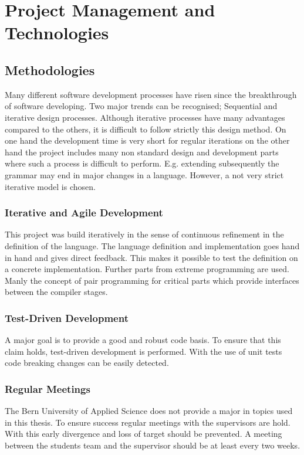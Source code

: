 \part{Project Management and Technologies}
\chapter{Methodologies}
Many different software development processes have risen since the
breakthrough of software developing. Two major trends can be recognised;
Sequential and iterative design processes. Although iterative processes
have many advantages compared to the others, it is difficult to follow
strictly this design method. On one hand the development time is very
short for regular iterations on the other hand the project includes
many non standard design and development parts where such a process is
difficult to perform. E.g. extending subsequently the grammar may end
in major changes in a language. However, a not very strict iterative
model is chosen.

\section{Iterative and Agile Development}
This project was build iteratively in the sense of continuous
refinement in the definition of the language. The language definition and
implementation goes hand in hand and gives direct feedback. This makes it
possible to test the definition on a concrete implementation. Further
parts from extreme programming are used. Manly the concept of pair
programming for critical parts which provide interfaces between the
compiler stages.

\section{Test-Driven Development}
A major goal is to provide a good and robust code basis. To ensure that
this claim holds, test-driven development is performed. With the use of
unit tests code breaking changes can be easily detected.

\section{Regular Meetings}
The Bern University of Applied Science does not provide a major in
topics used in this thesis. To ensure success regular meetings with the
supervisors are hold. With this early divergence and loss of target should
be prevented. A meeting between the students team and the supervisor
should be at least every two weeks.

